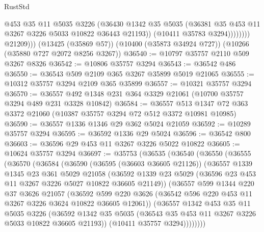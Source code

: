 \begin{lexlean}{RustStd}
\begin{coremodule}
{\begin{coremodule}
{{{{{{{{{{{{{{{{{{{{{{{{{                        @453
                        @35
                        @11
                        @5035
                        @3226
                        (@36430
                          @1342
                          @35
                          @5035
                          (@36381 @35 @453 @11 @3267 @3226 @5033 @10822 @36443 @21193))
                        (@10411 @35783 @3294))))))))
          @21209)))
    (@13425 (@35869 @57))
    (@10400 (@35873 @34924 @727))
    (@10266 (@35880 @727 @2072 @8256 @3267))
@36540 := @10797 @35757 @2110 @509 @3267 @8326
@36542 := @10806 @35757 @3294
@36543 := @36542 @486
@36550 := @36543 @509 @2109 @365 @3267 @35899 @5019 @21065
@36555 := @10312 @35757 @3294 @2109 @365 @35899
@36557 := @10321 @35757 @3294
@36570 := @36557 @492 @1348 @231 @364 @3329 @21061 (@10700 @35757 @3294 @489 @231 @3328 @10842)
@36584 := @36557 @513 @1347 @72 @363 @3372 @21060 (@10387 @35757 @3294 @72 @512 @3372 @10981 @10985)
@36590 := @36557 @1336 @1346 @29 @362 @5024 @21059
@36592 := @10289 @35757 @3294
@36595 := @36592 @1336 @29 @5024
@36596 := @36542 @800
@36603 := @36596 @29 @453 @11 @3267 @3226 @5022 @10822
@36605 := @10624 @35757 @3294
@36697 := @35753
    (@36535
      (@36540
        (@36550
          (@36555
            (@36570
              (@36584
                (@36590
                  (@36595 (@36603 @36605 @21126))
                  (@36557
                    @1339
                    @1345
                    @23
                    @361
                    @5029
                    @21058
                    (@36592
                      @1339
                      @23
                      @5029
                      (@36596 @23 @453 @11 @3267 @3226 @5027 @10822 @36605 @21149))
                    (@36557
                      @599
                      @1344
                      @220
                      @37
                      @3626
                      @21057
                      (@36592
                        @599
                        @220
                        @3626
                        (@36542 @596 @220 @453 @11 @3267 @3226 @3624 @10822 @36605 @12061))
                      (@36557
                        @1342
                        @453
                        @35
                        @11
                        @5035
                        @3226
                        (@36592
                          @1342
                          @35
                          @5035
                          (@36543 @35 @453 @11 @3267 @3226 @5033 @10822 @36605 @21193))
                        (@10411 @35757 @3294))))))))
}}}}}}}}}}}}}}}}}}}}}}}}}
\end{coremodule}}
\end{coremodule}
\end{lexlean}
